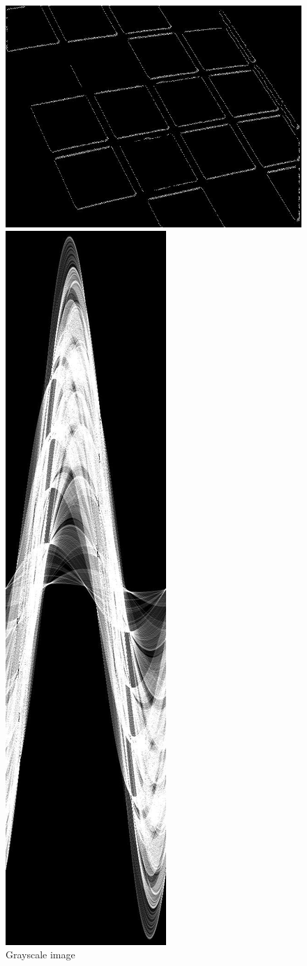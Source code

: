 \documentclass[12pt,a4paper]{article}
\begin{document}
\begin{figure}[!h]
    \begin{center}
        \includegraphics[width=.5\textwidth]{assets/im.jpg}
        \caption{Grayscale image}
        \label{fig:grayscale}
        \includegraphics[width=.5\textwidth]{assets/h.jpg}

\end{center}
\end{figure}
\end{document}
